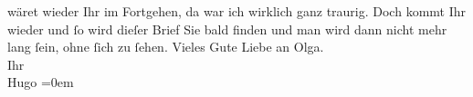 \begin{ledgroupsized}[t]{13cm}
               wäret wieder Ihr im Fortgehen, da war ich wirklich ganz traurig. Doch kommt Ihr
               wieder und ſo wird dieſer Brief Sie bald finden und man wird dann nicht mehr lang
               ſein, ohne ſich zu ſehen.\pend
           \pstart
           Vieles Gute Liebe an Olga.{\\[\baselineskip]}Ihr{\\[\baselineskip]}\spacefill\mbox{Hugo}\pend
           \leftskip=0em{}
         
         \endnumbering{}\end{ledgroupsized}  \newcommand{\dateiname}{L02021}\newcommand{\titel}{Hugo von Hofmannsthal an Arthur Schnitzler, 2. 6. [1911]}\newcommand{\editorInnen}{Martin Anton Müller und Gerd-Hermann Susen}
      